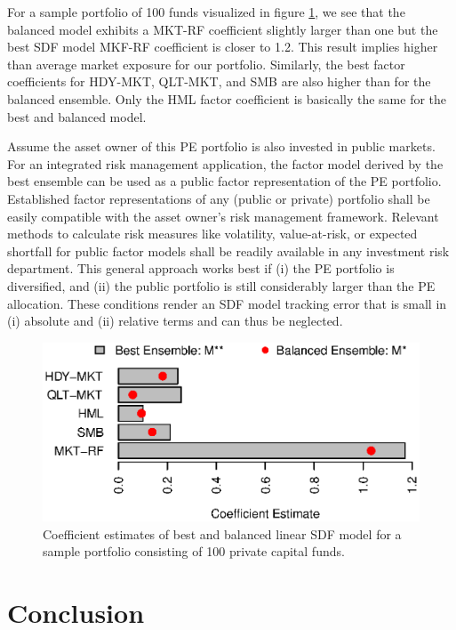 \documentclass[12pt]{article}
\begin{document}
For a sample portfolio of 100 funds visualized in figure \ref{fig:coef_barchart_100_pofo}, we see that the balanced model exhibits a MKT-RF coefficient slightly larger than one but the best SDF model MKF-RF coefficient is closer to 1.2.
This result implies higher than average market exposure for our portfolio.
Similarly, the best factor coefficients for HDY-MKT, QLT-MKT, and SMB are also higher than for the balanced ensemble.
Only the HML factor coefficient is basically the same for the best and balanced model.

Assume the asset owner of this PE portfolio is also invested in public markets.
For an integrated risk management application, the factor model derived by the best ensemble can be used as a public factor representation of the PE portfolio.
Established factor representations of any (public or private) portfolio shall be easily compatible with the asset owner's risk management framework.
Relevant methods to calculate risk measures like volatility, value-at-risk, or expected shortfall for public factor models shall be readily available in any investment risk department. 
This general approach works best if (i) the PE portfolio is diversified, and (ii) the public portfolio is still considerably larger than the PE allocation.
These conditions render an SDF model tracking error that is small in (i) absolute and (ii) relative terms and can thus be neglected.

\begin{figure}[H]
	\centering
	\includegraphics{Figures/Coefs100Pofo}
	\caption{Coefficient estimates of best and balanced linear SDF model for a sample portfolio consisting of 100 private capital funds.}
	\label{fig:coef_barchart_100_pofo}
\end{figure}

\fi


\section{Conclusion}
\label{sec:conclusion}
\end{document}
